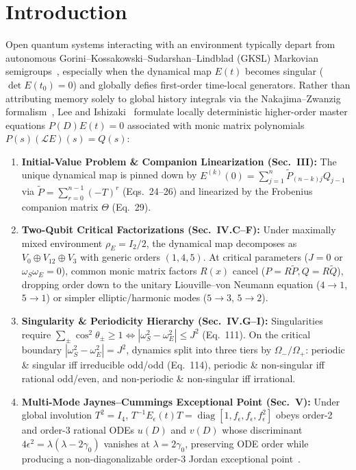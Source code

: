 \documentclass[10pt,twocolumn]{article}
\begin{document}
\section{Introduction}\label{sec:intro}
Open quantum systems interacting with an environment typically depart from autonomous Gorini--Kossakowski--Sudarshan--Lindblad (GKSL) Markovian semigroups~\cite{gorini1976completely,lindblad1976generators}, especially when the dynamical map $E(t)$ becomes singular ($\det E(t_0) = 0$) and globally defies first-order time-local generators. Rather than attributing memory solely to global history integrals via the Nakajima--Zwanzig formalism~\cite{nakajima1958quantum}, Lee and Ishizaki~\cite{lee2026local,ishizaki2026polynomial} formulate locally deterministic higher-order master equations $P(D)E(t) = 0$ associated with monic matrix polynomials $P(s)(\mathcal{L}E)(s) = Q(s)$:
\begin{enumerate}[leftmargin=*,nosep]
  \item \textbf{Initial-Value Problem \& Companion Linearization (Sec.~III):} The unique dynamical map is pinned down by $E^{(k)}(0) = \sum_{j=1}^n \tilde{P}_{(n-k)j} Q_{j-1}$ via $\tilde{P} = \sum_{r=0}^{n-1}(-T)^r$ (Eqs.~24--26) and linearized by the Frobenius companion matrix $\Theta$ (Eq.~29).
  \item \textbf{Two-Qubit Critical Factorizations (Sec.~IV.C--F):} Under maximally mixed environment $\rho_E = I_2/2$, the dynamical map decomposes as $V_0 \oplus V_{12} \oplus V_3$ with generic orders $(1, 4, 5)$. At critical parameters ($J = 0$ or $\omega_S \omega_E = 0$), common monic matrix factors $R(x)$ cancel ($P = R\tilde{P}, Q = R\tilde{Q}$), dropping order down to the unitary Liouville--von Neumann equation ($4 \to 1$, $5 \to 1$) or simpler elliptic/harmonic modes ($5 \to 3$, $5 \to 2$).
  \item \textbf{Singularity \& Periodicity Hierarchy (Sec.~IV.G--I):} Singularities require $\sum_\pm \cos^2 \theta_\pm \ge 1 \iff |\omega_S^2 - \omega_E^2| \le J^2$ (Eq.~111). On the critical boundary $|\omega_S^2 - \omega_E^2| = J^2$, dynamics split into three tiers by $\Omega_-/\Omega_+$: periodic \& singular iff irreducible odd/odd (Eq.~114), periodic \& non-singular iff rational odd/even, and non-periodic \& non-singular iff irrational.
  \item \textbf{Multi-Mode Jaynes--Cummings Exceptional Point (Sec.~V):} Under global involution $T^2 = I_4$, $T^{-1}E_\epsilon(t)T = \operatorname{diag}[1, f_\epsilon, f_\epsilon, f_\epsilon^2]$ obeys order-2 and order-3 rational ODEs $u(D)$ and $v(D)$ whose discriminant $4\epsilon^2 = \lambda(\lambda - 2\gamma_0)$ vanishes at $\lambda = 2\gamma_0$, preserving ODE order while producing a non-diagonalizable order-3 Jordan exceptional point~\cite{kato1966perturbation}.
\end{enumerate}
\end{document}
